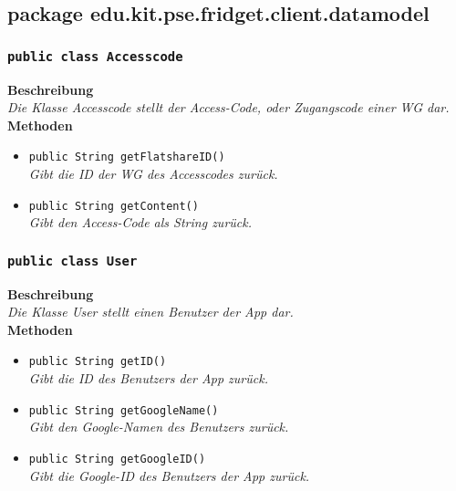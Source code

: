 \subsection{package edu.kit.pse.fridget.client.datamodel}
\subsubsection{\texttt{public class Accesscode}}

	\textbf{Beschreibung} \\
	\textit{Die Klasse Accesscode stellt der Access-Code, oder Zugangscode einer WG dar.} \\

	\textbf{Methoden}
	\begin{itemize}
		\item{\texttt{public String getFlatshareID()}}\\
		\textit{Gibt die ID der WG des Accesscodes zurück.}\\
		\item{\texttt{public String getContent()}}\\
		\textit{Gibt den Access-Code als String zurück.}\\
	\end{itemize}

	

\subsubsection{\texttt{public class User}}

	\textbf{Beschreibung} \\
	\textit{Die Klasse User stellt einen Benutzer der App dar.}\\

	\textbf{Methoden}
	\begin{itemize}
	\item{\texttt{public String getID()}}\\
	\textit{Gibt die ID des Benutzers der App zurück.}\\
	\item{\texttt{public String getGoogleName()}}\\
	\textit{Gibt den Google-Namen des Benutzers zurück.}\\
	
	\item{\texttt{public String getGoogleID()}}\\
	\textit{Gibt die Google-ID des Benutzers der App zurück.}\\
	\end{itemize}

